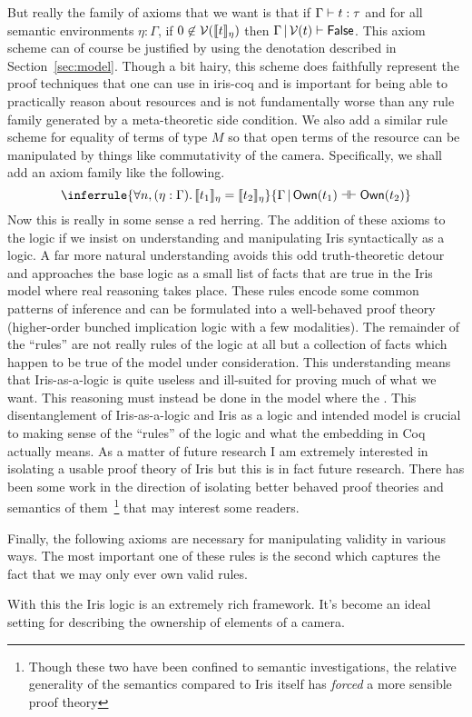 \documentclass{amsart}
\newcommand{\provesJ}[3]{#1 \mathop{\vert} #2 \proves #3}
\newcommand{\provesIffJ}[3]{#1 \mathop{\vert} #2 \provesIff #3}
\begin{document}
But really the family of axioms that we want is that if
$\Gamma \vdash t : \tau$ and for all semantic environments
$\eta : \Gamma$, if $0 \not\in \mathcal{V}(\llbracket t \rrbracket_\eta)$ then
$\provesJ{\Gamma}{\mval(t)}{\FALSE}$. This axiom scheme can of course
be justified by using the denotation described in
Section~\ref{sec:model}. Though a bit hairy, this scheme does
faithfully represent the proof techniques that one can use in iris-coq
and is important for being able to practically reason about resources
and is not fundamentally worse than any rule family generated by a
meta-theoretic side condition. We also add a similar rule scheme for
equality of terms of type $M$ so that open terms of the resource can
be manipulated by things like commutativity of the
camera. Specifically, we shall add an axiom family like the
following.
\[
  \inferrule{
    \All n, (\eta : \Gamma). \Sem{t_1}_\eta = \Sem{t_2}_\eta
  }{\provesIffJ{\Gamma}{\ownM{t_1}}{\ownM{t_2}}}
\]
Now this is really in some sense a red herring. The addition of these
axioms to the logic if we insist on understanding and manipulating
Iris syntactically as a logic. A far more natural understanding avoids
this odd truth-theoretic detour and approaches the base logic as a
small list of facts that are true in the Iris model where real
reasoning takes place. These rules encode some common patterns of
inference and can be formulated into a well-behaved proof theory
(higher-order bunched implication logic with a few modalities). The
remainder of the ``rules'' are not really rules of the logic at all
but a collection of facts which happen to be true of the model under
consideration. This understanding means that Iris-as-a-logic is quite
useless and ill-suited for proving much of what we want. This
reasoning must instead be done in the model where the . This
disentanglement of Iris-as-a-logic and Iris as a logic and intended
model is crucial to making sense of the ``rules'' of the logic and
what the embedding in Coq actually means. As a matter of future
research I am extremely interested in isolating a usable proof theory
of Iris but this is in fact future research. There has been some work
in the direction of isolating better behaved proof theories and
semantics of them~\citep{Biering:07,Bizjak:17}\footnote{Though these
  two have been confined to semantic investigations, the relative
  generality of the semantics compared to Iris itself has
  \emph{forced} a more sensible proof theory} that may interest some
readers.

Finally, the following axioms are necessary for manipulating validity
in various ways. The most important one of these rules is the second
which captures the fact that we may only ever own valid rules.
With this the Iris logic is an extremely rich framework. It's become
an ideal setting for describing the ownership of elements of a camera.
\end{document}

